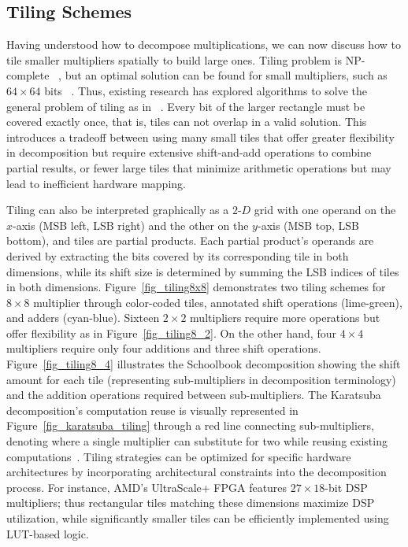 \documentclass[conference]{IEEEtran}
\begin{document}


\subsection{Tiling Schemes} \label{sec_background_tiling}
Having understood how to decompose multiplications, we can now discuss how to tile smaller multipliers spatially to build large ones.
Tiling problem is NP-complete ~\cite{BeumontTilingNPComplete2002, LevinTilingNP1984, LevinTilingNP1986}, but an optimal solution can be found for small multipliers, such as $64\times64$ bits ~\cite{zipfResourceOptimalDesign2017}.
Thus, existing research has explored algorithms to solve the general problem of tiling as in ~\cite{pascaLargeMultipliersLessDSP2009,royTileMultiplicationEfficient2014,kummTilingILP2017, kummKaratsubaRectangularMultipliers2018, kummTilingHeuristics2020}. 
Every bit of the larger rectangle must be covered exactly once, that is, tiles can not overlap in a valid solution. 
This introduces a tradeoff between using many small tiles that offer greater flexibility in decomposition but require extensive shift-and-add operations to combine partial results, or fewer large tiles that minimize arithmetic operations but may lead to inefficient hardware mapping.

Tiling can also be interpreted graphically as a $\textit{2-D}$ grid with one operand on the $x$-axis (MSB left, LSB right) and the other on the $y$-axis (MSB top, LSB bottom), and tiles are partial products. 
Each partial product's operands are derived by extracting the bits covered by its corresponding tile in both dimensions, while its shift size is determined by summing the LSB indices of tiles in both dimensions.
Figure~\ref{fig_tiling8x8} demonstrates two tiling schemes for $8\times8$ multiplier through color-coded tiles, annotated shift operations (lime-green), and adders (cyan-blue). 
Sixteen $2\times2$ multipliers require more operations but offer flexibility as in Figure~\ref{fig_tiling8_2}.
On the other hand, four  $4\times4$ multipliers require only four additions and three shift operations. 
Figure~\ref{fig_tiling8_4} illustrates the Schoolbook decomposition showing the shift amount for each tile (representing sub-multipliers in decomposition terminology) and the addition operations required between sub-multipliers.
The Karatsuba decomposition's computation reuse is visually represented in Figure~\ref{fig_karatsuba_tiling} through a red line connecting sub-multipliers, denoting where a single multiplier can substitute for two while reusing existing computations~\cite{kummKaratsubaRectangularMultipliers2018}. 
Tiling strategies can be optimized for specific hardware architectures by incorporating architectural constraints into the decomposition process. 
For instance, AMD's UltraScale+ FPGA features $27\times18$-bit DSP multipliers; thus rectangular tiles matching these dimensions maximize DSP utilization, while significantly smaller tiles can be efficiently implemented using LUT-based logic. 
\end{document}
